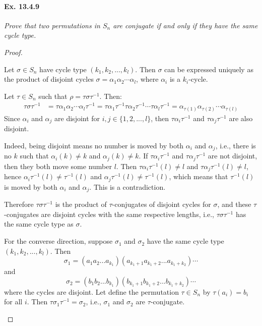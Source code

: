 \documentclass[11pt,a4paper]{article}
\newcommand{\be} {\begin{enumerate}}
\newcommand{\ee} {\end{enumerate}}
\begin{document}
\paragraph{Ex. 13.4.9}

{\it Prove that two permutations in $S_n$ are conjugate if and only if they have the same cycle type.
\begin{proof}
\be
Let $\sigma \in S_n$ have cycle type $(k_1,k_2,...,k_l)$. Then $\sigma$ can be expressed uniquely as the product of disjoint cycles $\sigma=\alpha_1\alpha_2\cdots\alpha_l$, where $\alpha_i$ is a $k_i$-cycle.

Let $\tau\in S_n$ such that $\rho=\tau\sigma\tau^{-1}$. Then:
\begin{align*}
  \tau\sigma\tau^{-1}&=\tau\alpha_1\alpha_2\cdots\alpha_l\tau^{-1}=\tau\alpha_1\tau^{-1}\tau\alpha_2\tau^{-1}\cdots\tau\alpha_l\tau^{-1}=\alpha_{\tau(1)}\alpha_{\tau(2)}\cdots\alpha_{\tau(l)}  
\end{align*}
Since $\alpha_i$ and $\alpha_j$ are disjoint for $i,j\in\{1,2,...,l\}$, then $\tau\alpha_i\tau^{-1}$ and $\tau\alpha_j\tau^{-1}$ are also disjoint. 

Indeed, being disjoint means no number is moved by both $\alpha_i$ and $\alpha_j$, i.e., there is no $k$ such that $\alpha_i(k)\ne k$ and $\alpha_j(k)\ne k$. If $\tau\alpha_i\tau^{-1}$ and $\tau\alpha_j\tau^{-1}$ are not disjoint, then they both move some number $l$. Then $\tau\alpha_i\tau^{-1}(l)\ne l$ and $\tau\alpha_j\tau^{-1}(l)\ne l$, hence $\alpha_i\tau^{-1}(l)\ne \tau^{-1}(l)$ and $\alpha_j\tau^{-1}(l)\ne \tau^{-1}(l)$, which means that $\tau^{-1}(l)$ is moved by both $\alpha_i$ and $\alpha_j$. This is a contradiction. 

Therefore $\tau\sigma\tau^{-1}$ is the product of $\tau$-conjugates of disjoint cycles for $\sigma$, and these $\tau$-conjugates are disjoint cycles with the same respective lengths, i.e., $\tau\sigma\tau^{-1}$ has the same cycle type as $\sigma$.

For the converse direction, suppose $\sigma_1$ and $\sigma_2$ have the same cycle type $(k_1,k_2,...,k_l)$. Then
$$\sigma_1=(a_1a_2... a_{k_1})(a_{k_1+1}a_{k_1+2}... a_{k_1+k_2})\cdots$$
and
$$\sigma_2=(b_1b_2... b_{k_1})(b_{k_1+1}b_{k_1+2}... b_{k_1+k_2})\cdots$$
where the cycles are disjoint. Let define the permutation $\tau\in S_n$ by $\tau(a_i)=b_i$ for all $i$. Then $\tau\sigma_1\tau^{-1}=\sigma_2$, i.e., $\sigma_1$ and $\sigma_2$ are $\tau$-conjugate.
\ee\end{proof}
}
\end{document}
